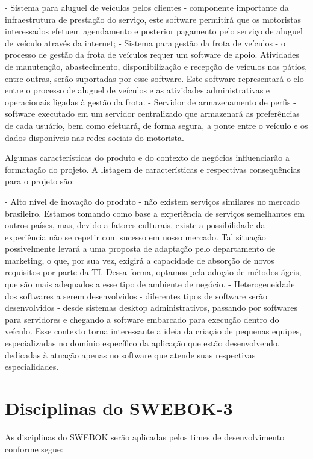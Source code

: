 \documentclass[12pt,journal,compsoc]{IEEEtran}
\begin{document}
- Sistema para aluguel de veículos pelos clientes - componente importante da infraestrutura de prestação do serviço, este software permitirá que os motoristas interessados efetuem agendamento e posterior pagamento pelo serviço de aluguel de veículo através da internet;
- Sistema para gestão da frota de veículos - o processo de gestão da frota de veículos requer um software de apoio. Atividades de manutenção, abastecimento, disponibilização e recepção de veículos nos pátios, entre outras, serão suportadas por esse software. Este software representará o elo entre o processo de aluguel de veículos e as atividades administrativas e operacionais ligadas à gestão da frota.
- Servidor de armazenamento de perfis - software executado em um servidor centralizado que armazenará as preferências de cada usuário, bem como efetuará, de forma segura, a ponte entre o veículo e os dados disponíveis nas redes sociais do motorista.

Algumas características do produto e do contexto de negócios influenciarão a formatação do projeto. A listagem de características e respectivas consequências para o projeto são:

- Alto nível de inovação do produto - não existem serviços similares no mercado brasileiro. Estamos tomando como base a experiência de serviços semelhantes em outros países, mas, devido a fatores culturais, existe a possibilidade da experiência não se repetir com sucesso em nosso mercado. Tal situação possivelmente levará a uma proposta de adaptação pelo departamento de marketing, o que, por sua vez, exigirá a capacidade de absorção de novos requisitos por parte da TI. Dessa forma, optamos pela adoção de métodos ágeis, que são mais adequados a esse tipo de ambiente de negócio.
- Heterogeneidade dos softwares a serem desenvolvidos - diferentes tipos de software serão desenvolvidos - desde sistemas desktop administrativos, passando por softwares para servidores e chegando a software embarcado para execução dentro do veículo. Esse contexto torna interessante a ideia da criação de pequenas equipes, especializadas no domínio específico da aplicação que estão desenvolvendo, dedicadas à atuação apenas no software que atende suas respectivas especialidades.


\section{Disciplinas do SWEBOK-3}

As disciplinas do SWEBOK serão aplicadas pelos times de desenvolvimento conforme segue: 
\end{document}
